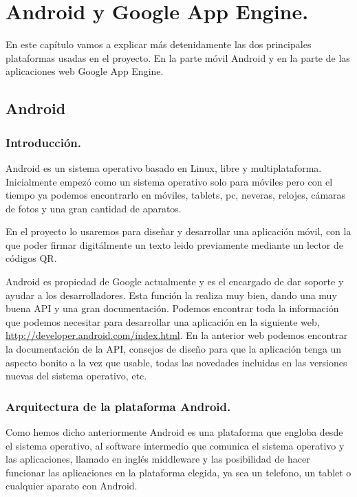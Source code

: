 \chapter{Android y Google App Engine.}

En este capítulo vamos a explicar más detenidamente las dos principales plataformas usadas en el proyecto. En la parte móvil Android y en la parte de las aplicaciones web Google App Engine. 

\section{Android}\label{cap:android}

\subsection{Introducción.}

Android es un sistema operativo basado en Linux, libre y multiplataforma. Inicialmente empezó como un sistema operativo solo para móviles pero con el tiempo ya podemos encontrarlo en móviles, tablets, pc, neveras, relojes, cámaras de fotos y una gran cantidad de aparatos.

En el proyecto lo usaremos para diseñar y desarrollar una aplicación móvil, con la que poder firmar digitálmente un texto leido previamente mediante un lector de códigos QR.

Android es propiedad de Google actualmente y es el encargado de dar soporte y ayudar a los desarrolladores. Esta función la realiza muy bien, dando una muy buena API y una gran documentación. Podemos encontrar toda la información que podemos necesitar para desarrollar una aplicación en la siguiente web, \url{http://developer.android.com/index.html}. En la anterior web podemos encontrar la documentación de la API, consejos de diseño para que la aplicación tenga un aspecto bonito a la vez que usable, todas las novedades incluidas en las versiones nuevas del sistema operativo, etc.

\subsection{Arquitectura de la plataforma Android.}

Como hemos dicho anteriormente Android es una plataforma que engloba desde el sistema operativo, al software intermedio que comunica el sistema operativo y las aplicaciones, llamado en inglés middleware y las posibilidad de hacer funcionar las aplicaciones en la plataforma elegida, ya sea un telefono, un tablet o cualquier aparato con Android.

